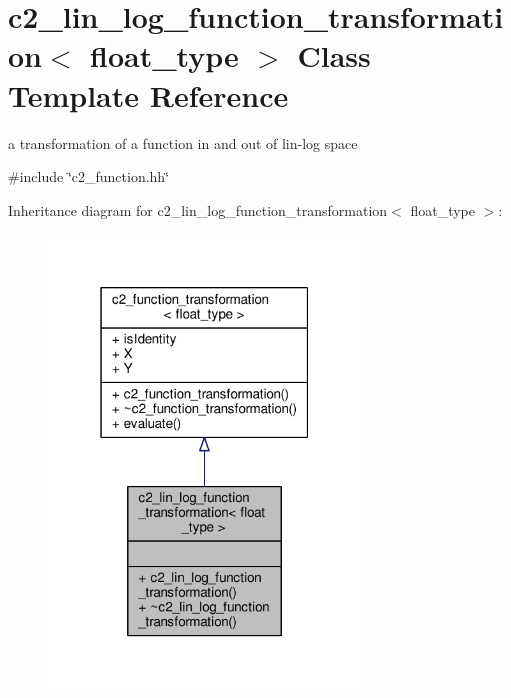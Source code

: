 \hypertarget{classc2__lin__log__function__transformation}{}\section{c2\+\_\+lin\+\_\+log\+\_\+function\+\_\+transformation$<$ float\+\_\+type $>$ Class Template Reference}
\label{classc2__lin__log__function__transformation}


a transformation of a function in and out of lin-\/log space  




{\ttfamily \#include \char`\"{}c2\+\_\+function.\+hh\char`\"{}}



Inheritance diagram for c2\+\_\+lin\+\_\+log\+\_\+function\+\_\+transformation$<$ float\+\_\+type $>$\+:
\nopagebreak
\begin{figure}[H]
\begin{center}
\leavevmode
\includegraphics[width=235pt]{classc2__lin__log__function__transformation__inherit__graph}
\end{center}
\end{figure}


